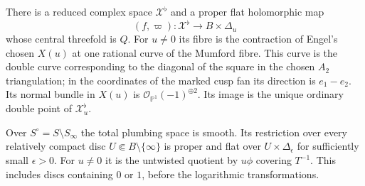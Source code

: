 \begin{theorem}\hypertarget{tag-02ZI}{}\label{push:src:A.1.2}\label{push:A12}
\hypertarget{tag-01R2}{}\label{fam:src:E.1.2}\label{fam:st:E.1.2}

There is a reduced complex space $\mathcal X^\flat$ and a proper flat
holomorphic map
\[
 (f,\varpi):\mathcal X^\flat\longrightarrow B\times\Delta_u
\]
whose central threefold is $Q$. For $u\ne0$ its fibre is the
contraction of Engel's chosen $X(u)$ at one rational curve of the
Mumford fibre. This curve is the double curve corresponding to the
diagonal of the square in the chosen $A_2$ triangulation; in the
coordinates of the marked cusp fan its direction is $e_1-e_2$. Its normal bundle
in $X(u)$ is $\mathcal O_{\mathbb P^1}(-1)^{\oplus2}$. Its image is
the unique ordinary double point of $\mathcal X^\flat_u$.

Over $S^\circ=S\setminus S_\infty$ the total plumbing space is smooth. Its restriction over every relatively compact disc $U\Subset B\setminus\{\infty\}$ is proper and flat over $U\times\Delta_\epsilon$ for sufficiently small $\epsilon>0$. For $u\ne0$ it is the untwisted quotient by $u\phi$ covering $T^{-1}$. This includes discs containing $0$ or $1$, before the logarithmic transformations.
\end{theorem}


